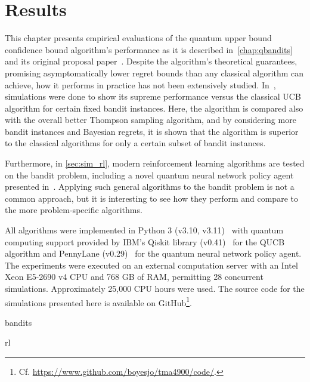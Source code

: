 \chapter{Results}
\label{chap:simulations}

This chapter presents empirical evaluations of the quantum upper bound confidence bound algorithm's performance as it is described in~\cref{chap:qbandits} and its original proposal paper~\autocite{wan2022}.
Despite the algorithm's theoretical guarantees, promising asymptomatically lower regret bounds than any classical algorithm can achieve, how it performs in practice has not been extensively studied.
In~\autocite{wan2022}, simulations were done to show its supreme performance versus the classical UCB algorithm for certain fixed bandit instances.
Here, the algorithm is compared also with the overall better Thompson sampling algorithm, and by considering more bandit instances and Bayesian regrets, it is shown that the algorithm is superior to the classical algorithms for only a certain subset of bandit instances.

Furthermore, in \cref{sec:sim_rl}, modern reinforcement learning algorithms are tested on the bandit problem, including a novel quantum neural network policy agent presented in~\autocite{jerbi2021a}.
Applying such general algorithms to the bandit problem is not a common approach, but it is interesting to see how they perform and compare to the more problem-specific algorithms.

All algorithms were implemented in Python 3 (v3.10, v3.11)~\autocite{python} with quantum computing support provided by IBM's Qiskit library (v0.41)~\autocite{qiskit} for the QUCB algorithm and PennyLane (v0.29)~\autocite{pennylane} for the quantum neural network policy agent.
The experiments were executed on an external computation server with an Intel Xeon E5-2690 v4 CPU and 768 GB of RAM, permitting 28 concurrent simulations.
Approximately 25,000 CPU hours were used.
The source code for the simulations presented here is available on GitHub\footnote{
    Cf. \url{https://www.github.com/boyesjo/tma4900/code/}.
}.


{bandits}
\pagebreak\clearpage



{rl}

\pagebreak\clearpage
